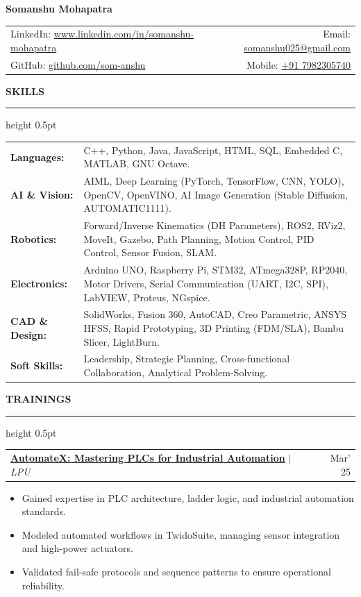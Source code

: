 \documentclass[10pt,a4paper]{article}
\newcommand{\resumeheading}[1]{
    \vspace{8pt}
    {\large\textbf{\color{resblue} #1}}
    \vspace{1pt}
    {\color{resblue}\hrule height 0.5pt}
    \vspace{4pt}
}
\begin{document}
{\LARGE\textbf{\color{resblue} Somanshu Mohapatra}}
\vspace{3pt}

\begin{tabularx}{\textwidth}{@{}X r@{}}
LinkedIn: \href{https://linkedin.com/in/somanshu-mohapatra}{www.linkedin.com/in/somanshu-mohapatra} & Email: \href{mailto:somanshu025@gmail.com}{somanshu025@gmail.com} \\
GitHub: \href{https://github.com/som-anshu}{github.com/som-anshu} & Mobile: \href{tel:+917982305740}{+91 7982305740}
\end{tabularx}

\resumeheading{SKILLS}
\begin{tabularx}{\textwidth}{@{}p{3.2cm} X@{}}
    \textbf{\color{resblue} Languages:} & C++, Python, Java, JavaScript, HTML, SQL, Embedded C, MATLAB, GNU Octave. \\
    \textbf{\color{resblue} AI \& Vision:} & AIML, Deep Learning (PyTorch, TensorFlow, CNN, YOLO), OpenCV, OpenVINO, AI Image Generation (Stable Diffusion, AUTOMATIC1111). \\
    \textbf{\color{resblue} Robotics:} & Forward/Inverse Kinematics (DH Parameters), ROS2, RViz2, MoveIt, Gazebo, Path Planning, Motion Control, PID Control, Sensor Fusion, SLAM. \\
    \textbf{\color{resblue} Electronics:} & Arduino UNO, Raspberry Pi, STM32, ATmega328P, RP2040, Motor Drivers, Serial Communication (UART, I2C, SPI), LabVIEW, Proteus, NGspice. \\
    \textbf{\color{resblue} CAD \& Design:} & SolidWorks, Fusion 360, AutoCAD, Creo Parametric, ANSYS HFSS, Rapid Prototyping, 3D Printing (FDM/SLA), Bambu Slicer, LightBurn. \\
    \textbf{\color{resblue} Soft Skills:} & Leadership, Strategic Planning, Cross-functional Collaboration, Analytical Problem-Solving.
\end{tabularx}

\resumeheading{TRAININGS}
\begin{tabularx}{\textwidth}{@{}X r@{}}
\textbf{\color{resblue} \href{https://drive.google.com/file/d/1PUqcvq8SkgS4APbpqYSwzsYsXNxvOywR/view?usp=drive_link}{AutomateX: Mastering PLCs for Industrial Automation}} $|$ \textit{LPU} & Mar' 25
\end{tabularx}
\begin{itemize}[leftmargin=1.5em, itemsep=2pt, parsep=1pt, topsep=2pt]
    \item Gained expertise in PLC architecture, ladder logic, and industrial automation standards.
    \item Modeled automated workflows in TwidoSuite, managing sensor integration and high-power actuators.
    \item Validated fail-safe protocols and sequence patterns to ensure operational reliability.
\end{itemize}
\end{document}
